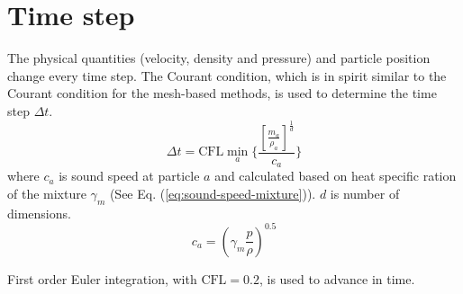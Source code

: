 \section{Time step}
The physical quantities (velocity, density and pressure) and particle position change every time step. The Courant condition, which is in spirit similar to the Courant condition for the mesh-based methods, is used to determine the time step $\Delta t$.
\begin{equation}
\Delta t = \textrm{CFL} \min_a \bigg \lbrace \dfrac{\left[\frac{m_a}{\rho_a}\right]^{\frac{1}{d}}}{c_a} \bigg \rbrace
\end{equation}
where $c_a$ is sound speed at particle $a$ and calculated based on heat specific ration of the mixture $\gamma_m$ (See Eq. (\ref{eq:sound-speed-mixture})). 
$d$ is number of dimensions. 
\begin{equation}
c_a = \left( \gamma_m \frac{p}{\rho} \right)^{0.5}
\label{eq:sound-speed-mixture}
\end{equation}

First order Euler integration, with $\textrm{CFL} = 0.2$, is used to advance in time.

